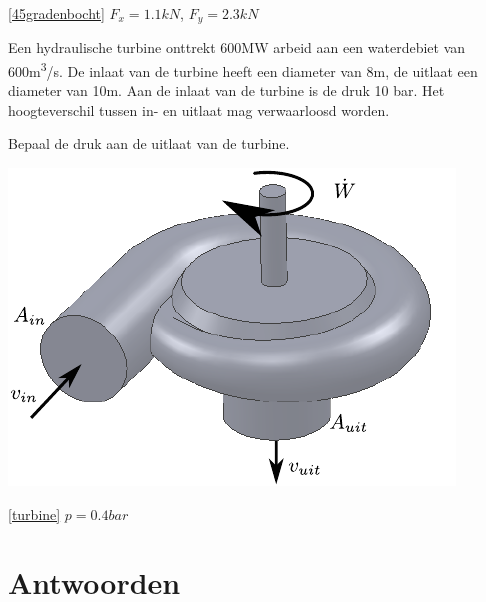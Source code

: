 	\begin{antwoord}{\ref{45gradenbocht}}
		$F_x = 1.1\unit{kN}$, $F_y = 2.3\unit{kN}$
	\end{antwoord}
	\begin{toepassing}[*]
		\label{turbine}
Een hydraulische turbine onttrekt 600MW arbeid aan een waterdebiet van 600\unit{m^3/s}. De inlaat van de turbine heeft een diameter van 8m, de uitlaat een diameter van 10m. Aan de inlaat van de turbine is de druk 10 bar. Het hoogteverschil tussen in- en uitlaat mag verwaarloosd worden.

Bepaal de druk aan de uitlaat van de turbine.
		\begin{center}
			\includegraphics{fig/behoudsvergelijkingen/turbine}
		\end{center}
	\end{toepassing}
	\begin{antwoord}{\ref{turbine}}
		$p = 0.4\unit{bar}$
	\end{antwoord}

	\section*{Antwoorden}
	\begin{multicols}{2}
	\end{multicols}
